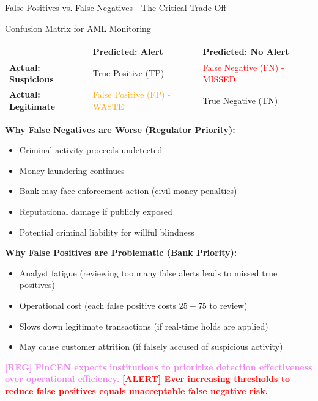 \documentclass[11pt,a4paper]{beamer}
\newcommand{\redflag}[1]{\textcolor{red}{\textbf{[ALERT] #1}}}
\newcommand{\regcite}[1]{\textcolor{violet}{\textbf{[REG] #1}}}
\begin{document}
	\begin{frame}{False Positives vs. False Negatives - The Critical Trade-Off}
		\begin{block}{Confusion Matrix for AML Monitoring}
			\centering
			\begin{tabular}{p{0.3\textwidth}|p{}|p{}}
				\hline
				\rowcolor{lightgray}
				& \textbf{Predicted: Alert} & \textbf{Predicted: No Alert} \\
				\hline
				\textbf{Actual: Suspicious} & True Positive (TP) & \textcolor{red}{False Negative (FN) - MISSED} \\
				\hline
				\textbf{Actual: Legitimate} & \textcolor{orange}{False Positive (FP) - WASTE} & True Negative (TN) \\
				\hline
			\end{tabular}
		\end{block}
		
		\textbf{Why False Negatives are Worse (Regulator Priority):}
		\begin{itemize}
			\item Criminal activity proceeds undetected
			\item Money laundering continues
			\item Bank may face enforcement action (civil money penalties)
			\item Reputational damage if publicly exposed
			\item Potential criminal liability for willful blindness
		\end{itemize}
		
		\textbf{Why False Positives are Problematic (Bank Priority):}
		\begin{itemize}
			\item Analyst fatigue (reviewing too many false alerts leads to missed true positives)
			\item Operational cost (each false positive costs $25-$75 to review)
			\item Slows down legitimate transactions (if real-time holds are applied)
			\item May cause customer attrition (if falsely accused of suspicious activity)
		\end{itemize}
		
		\regcite{FinCEN expects institutions to prioritize detection effectiveness over operational efficiency.}
		\redflag{Ever increasing thresholds to reduce false positives equals unacceptable false negative risk.}
	\end{frame}
	
\end{document}
